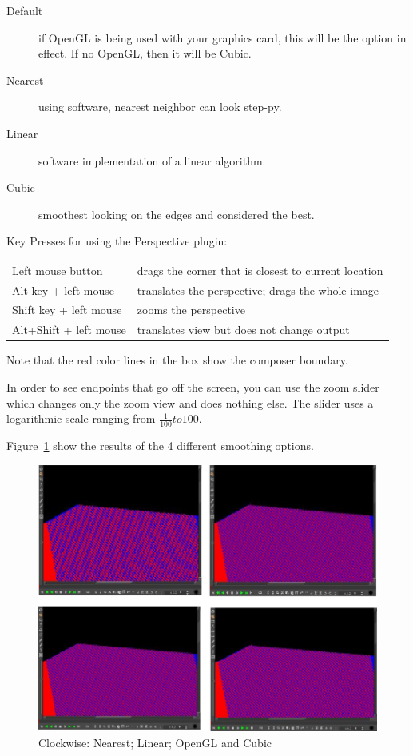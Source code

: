\begin{description}
    \item[Default] if OpenGL is being used with your graphics card, this will be the option in effect. If no OpenGL, then it will be Cubic.
    \item[Nearest] using software, nearest neighbor can look step-py.
    \item[Linear] software implementation of a linear algorithm.
    \item[Cubic] smoothest looking on the 
    edges and considered the best.
\end{description}

Key Presses for using the Perspective plugin:

\begin{longtable}{l l}
    \toprule
    Left mouse button & drags the corner that is closest to current location \\
    Alt key + left mouse & translates the perspective; drags the whole image \\
    Shift key + left mouse & zooms the perspective \\
    Alt+Shift + left mouse & translates view but does not change output \\
    \bottomrule
\end{longtable}

Note that the red color lines in the box show the composer boundary.

In order to see endpoints that go off the screen, you can use the zoom slider which changes only the zoom view and does nothing else. The slider uses a logarithmic scale ranging from $\frac{1}{100} to 100$. 

Figure~\ref{fig:perspective01} show the results of the 4 different smoothing options.

\begin{figure}[hbtp]
    \centering
    \includegraphics[width=0.7\linewidth]{images/perspective01.png}
    \caption{Clockwise: Nearest; Linear; OpenGL and Cubic}
    \label{fig:perspective01}
\end{figure}

